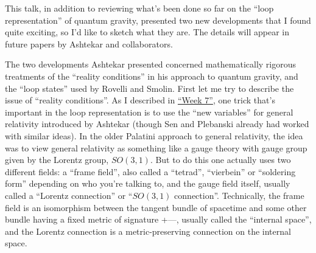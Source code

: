 \documentclass{article}
\begin{document}
This talk, in addition to reviewing what's been done so far on the
``loop representation'' of quantum gravity, presented two new
developments that I found quite exciting, so I'd like to sketch what
they are. The details will appear in future papers by Ashtekar and
collaborators.

The two developments Ashtekar presented concerned mathematically
rigorous treatments of the ``reality conditions'' in his approach to
quantum gravity, and the ``loop states'' used by Rovelli and Smolin.
First let me try to describe the issue of ``reality conditions''. As I
described in \protect\hyperlink{week7}{``Week 7''}, one trick that's
important in the loop representation is to use the ``new variables'' for
general relativity introduced by Ashtekar (though Sen and Plebanski
already had worked with similar ideas). In the older Palatini approach
to general relativity, the idea was to view general relativity as
something like a gauge theory with gauge group given by the Lorentz
group, \(SO(3,1)\). But to do this one actually uses two different
fields: a ``frame field'', also called a ``tetrad'', ``vierbein'' or
``soldering form'' depending on who you're talking to, and the gauge
field itself, usually called a ``Lorentz connection'' or ``\(SO(3,1)\)
connection''. Technically, the frame field is an isomorphism between the
tangent bundle of spacetime and some other bundle having a fixed metric
of signature +---, usually called the ``internal space'', and the
Lorentz connection is a metric-preserving connection on the internal
space.
\end{document}
